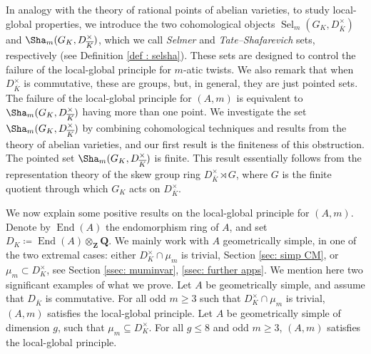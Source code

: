 \documentclass[a4paper,10pt]{amsart}
\theoremstyle{plain}
\newenvironment{theoremintro}[1]
  {\renewcommand\theinnertheoremintro{#1}\innertheoremintro}
  {\endinnertheoremintro}
\theoremstyle{definition}
\theoremstyle{remark}
\def\Q{\mathbf Q}
\def\Z{\mathbf Z}
\DeclareMathOperator{\Sel}{Sel}
\DeclareMathOperator{\End}{End}
\begin{document}
In analogy with the theory of rational points of abelian varieties, to study local-global properties, we introduce the two cohomological objects \(\Sel_m(G_K, D_{\overline{K}}^\times)\) and \(\Sha_m(G_K, D_{\overline{K}}^\times)\), which we call \emph{Selmer} and \emph{Tate--Shafarevich} sets, respectively (see Definition \ref{def : selsha}). These sets are designed to control the failure of the local-global principle for \(m\)-atic twists. We also remark that when \(D_{\overline{K}}^\times\) is commutative, these are groups, but, in general, they are just pointed sets. 
The failure of the local-global principle for \((A,m)\) is equivalent to 
\(\Sha_m(G_K, D_{\overline{K}}^\times)\) having more than one point. We investigate the set 
\(\Sha_m(G_K, D_{\overline{K}}^\times)\) by 
combining cohomological techniques and results from the theory of abelian varieties, and our first result is the finiteness of this obstruction. 
\begin{theoremintro}{A}[{Theorem \ref{theorem: finite sha}}]
 The pointed set \(\Sha_m(G_K, D_{\overline{K}}^\times)\) is finite. 
\end{theoremintro}
This result essentially follows from the representation theory of the skew group ring \(D_{\overline{K}}^\times \rtimes G\), where \(G\) is the finite quotient through which \(G_K\) acts on \(D_{\overline{K}}^\times\).

We now explain some positive results on the local-global principle for \((A,m)\). 
Denote by \(\End(A)\) the endomorphism ring of \(A\), and set \(D_K \coloneqq \End(A) \otimes_\Z \Q\). We mainly work with \(A\) geometrically simple, in one of the two extremal cases: either \(D_K^\times \cap \mu_m\) is trivial, Section \ref{sec: simp CM}, or \(\mu_m \subset D_K^\times\), see Section \ref{ssec: muminvar}, \ref{ssec: further apps}. We mention here two significant examples of what we prove.
\begin{theoremintro}{B}[Theorem \ref{thm: main_Gal}]
Let \(A\) be geometrically simple, and assume that \(D_{\overline{K}}\) is commutative. For all odd \(m \ge 3\) such that \(D_K^\times \cap \mu_m\) is trivial, \((A,m)\) satisfies the local-global principle.    
\end{theoremintro}
\begin{theoremintro}{C}[Corollary \ref{cor : easylgp}]
Let \(A\) be geometrically simple of dimension \(g\), such that \(\mu_m \subseteq D_K^\times\). For all \(g \leq 8\) and odd \(m \ge 3\), \((A,m)\) satisfies the local-global principle. 
\end{theoremintro}
\end{document}

